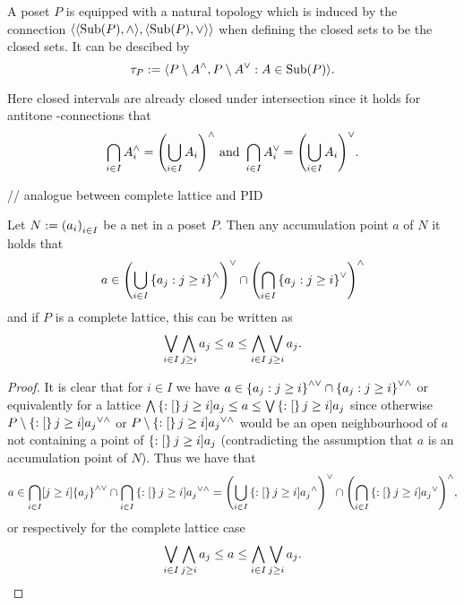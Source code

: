 \documentclass[8pt,a4paper]{article}
\begin{document}
\begin{definition}
    A poset $P$ is equipped with a natural topology which is induced by the  connection $\struct{\struct{\Sub(P),\meet},\struct{\Sub(P),\join}}$ when defining the closed sets to be the  closed sets. It can be descibed by $$\tau_P:=\gen{P\setminus A^{\meet},P\setminus A^{\join}: A\in\Sub(P)}.$$
\end{definition}
%
\begin{remark}
    Here closed intervals are already closed under intersection since it holds for antitone -connections that
    $$\bigcap_{i\in I}{A_i^{\wedge}}={\left(\bigcup_{i\in I}{A_i}\right)}^{\wedge} \textrm{ and } \bigcap_{i\in I}{A_i^{\vee}}={\left(\bigcup_{i\in I}{A_i}\right)}^{\vee}.$$
\end{remark}

// analogue between complete lattice and PID

\begin{lemma}
    Let $N:=\net[i\in I]{a_i}$ be a net in a poset $P$. Then any accumulation point $a$ of $N$ it holds that
    $$
    a\in {\left(\Setjoin_{i\in I}{\set{a_j}[j \geq i]^{\meet}}\right)}^{\join}\setmeet{\left(\Setmeet_{i\in I}\set{a_j}[j \geq i]^{\join}\right)}^{\meet}
    $$
    and if $P$ is a complete lattice, this can be written as
    $$
    \mathop\mathrm{\bigvee}_{i\in I}\mathop\mathrm{\bigwedge}_{j\geq i}{a_j}\leq a\leq \mathop\mathrm{\bigwedge}_{i\in I}\mathop\mathrm{\bigvee}_{j\geq i}{a_j}.
    $$
\end{lemma}%

\begin{proof}
    It is clear that for $i\in I$ we have $a\in\set{a_j}[j \geq i]^{\meet\join}\setmeet\set{a_j}[j \geq i]^{\join\meet}$ or equivalently for a lattice $\Meet\set[j \geq i]{a_j}\leq a\leq \Join\set[j \geq i]{a_j}$ since otherwise
    $P\setminus\set[j \geq i]{a_j}^{\join\meet}$ or $P\setminus\set[j \geq i]{a_j}^{\join\meet}$ would be an open neighbourhood of $a$ not containing a point of $\set[j\geq i]{a_j}$ (contradicting the assumption that $a$ is an accumulation point of $N$).
    Thus we have that
    $$
    a\in \Setmeet_{i\in I}[j \geq i]{\set{a_j}^{\meet\join}}\setmeet\Setmeet_{i\in I}\set[j \geq i]{a_j}^{\join\meet}=
    {\left(\Setjoin_{i\in I}{\set[j \geq i]{a_j}^{\meet}}\right)}^{\join}\setmeet{\left(\Setmeet_{i\in I}\set[j \geq i]{a_j}^{\join}\right)}^{\meet},
    $$
    or respectively for the complete lattice case
    $$
    \mathop\mathrm{\bigvee}_{i\in I}\mathop\mathrm{\bigwedge}_{j\geq i}{a_j}\leq a\leq \mathop\mathrm{\bigwedge}_{i\in I}\mathop\mathrm{\bigvee}_{j\geq i}{a_j}.
    $$
\end{proof}
\end{document}
